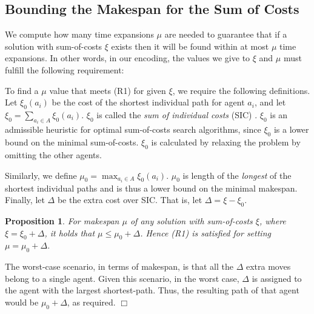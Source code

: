 \documentclass[jair,oneside,11pt]{article}
\begin{document}

\subsection{Bounding the Makespan for the Sum of Costs}
\label{sec:boundingTheMakespan}

We compute how many time expansions $\mu$ are needed to guarantee that if a solution with sum-of-costs $\xi$ exists then it will be found within at most $\mu$ time expansions. In other words, in our encoding, the values we give to $\xi$ and $\mu$ must fulfill the following requirement:

\vspace{0.25cm}
\vspace{0.25cm}

To find a $\mu$ value that meets (R1) for given $\xi$, we require the following definitions. Let $\xi_0(a_i)$ be the cost of the shortest individual path for agent $a_i$, and let
$\xi_0=\sum_{a_i\in A} \xi_0(a_i)$. $\xi_0$ is called the {\em sum of individual costs} (SIC) \cite{DBLP:journals/ai/SharonSGF13}. $\xi_0$ is an admissible heuristic for optimal sum-of-costs search algorithms, since $\xi_0$ is a lower bound on the minimal sum-of-costs. $\xi_0$ is calculated by relaxing the problem by omitting the other agents.

Similarly, we define $\mu_0=\max_{a_i\in A} \xi_0(a_i)$.  $\mu_0$ is length of the {\em longest} of the shortest individual paths and is thus a lower bound on the minimal makespan. Finally, let $\Delta$ be the extra cost over SIC. That is, let $\Delta =  \xi - \xi_0$.

\newtheorem{proposition}{Proposition}
\begin{proposition}
For makespan $\mu$ of any solution with sum-of-costs $\xi$, where $\xi = \xi_0 + \Delta$, it holds that $\mu \leq \mu_0 + \Delta$. Hence (R1) is satisfied for setting $\mu = \mu_0 + \Delta$. \label{prop:upperbound}
\end{proposition}

 The worst-case scenario, in terms of makespan, is that all the $\Delta$ extra moves belong to a single agent. Given this scenario, in the worst case, $\Delta$ is assigned to the agent with the largest shortest-path. Thus, the resulting path of that agent would be $\mu_0+\Delta$, as required. $\Box$
\end{document}

